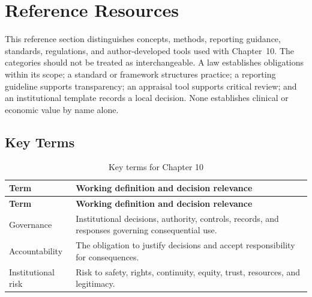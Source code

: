 \section{Reference Resources}
\label{sec:comp-ch10-reference}

This reference section distinguishes concepts, methods, reporting guidance,
standards, regulations, and author-developed tools used with Chapter~10. The
categories should not be treated as interchangeable. A law establishes obligations
within its scope; a standard or framework structures practice; a reporting guideline
supports transparency; an appraisal tool supports critical review; and an
institutional template records a local decision. None establishes clinical or
economic value by name alone. 

\subsection{Key Terms}
\begin{longtable}{@{}p{}p{}@{}}
\caption{Key terms for Chapter 10}
\label{tab:comp-ch10-key-terms}\\
\toprule
\textbf{Term} & \textbf{Working definition and decision relevance} \\
\midrule
\endfirsthead
\toprule
\textbf{Term} & \textbf{Working definition and decision relevance} \\
\midrule
\endhead
\bottomrule
\endlastfoot
Governance & Institutional decisions, authority, controls, records, and responses governing consequential use. \\
Accountability & The obligation to justify decisions and accept responsibility for consequences. \\
Institutional risk & Risk to safety, rights, continuity, equity, trust, resources, and legitimacy. \\
\end{longtable}

